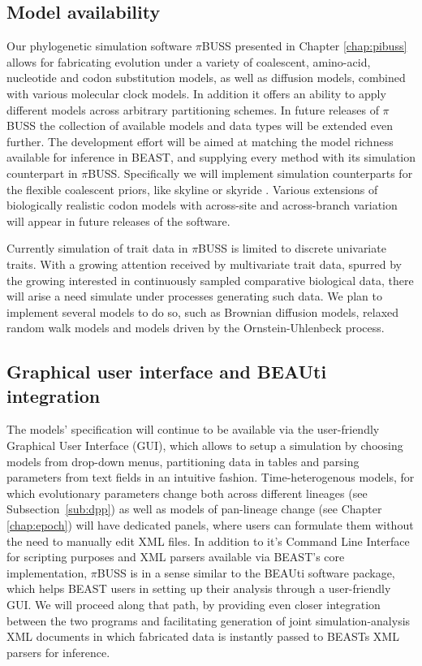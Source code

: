 \subsection{Model availability}

Our phylogenetic simulation software $\pi$BUSS presented in Chapter \ref{chap:pibuss} allows for fabricating evolution under a variety of coalescent, amino-acid, nucleotide and codon substitution models, as well as diffusion models, combined with various molecular clock models.
In addition it offers an ability to apply different models across arbitrary partitioning schemes. %
In future releases of $\pi$BUSS the collection of available models and data types will be extended even further.
The development effort will be aimed at matching the model richness available for inference in BEAST, and supplying every method with its simulation counterpart in $\pi$BUSS.
Specifically we will implement simulation counterparts for the flexible coalescent priors, like skyline \citep{Drummond2005} or skyride \citep{Minin2008b}.
Various extensions of biologically realistic codon models with across-site and across-branch variation will appear in future releases of the software.

Currently simulation of trait data in $\pi$BUSS is limited to discrete univariate traits.
With a growing attention received by multivariate trait data, spurred by the growing interested in continuously sampled comparative biological data, there will arise a need simulate under processes generating such data.
We plan to implement several models to do so, such as Brownian diffusion models, relaxed random walk models and models driven by the Ornstein-Uhlenbeck process.

\subsection{Graphical user interface and BEAUti integration}

The models' specification will continue to be available via the user-friendly Graphical User Interface (GUI), which allows to setup a simulation by choosing models from drop-down menus, partitioning data in tables and parsing parameters from text fields in an intuitive fashion.
Time-heterogenous models, for which evolutionary parameters change both across different lineages (see Subsection~\ref{sub:dpp}) as well as models of pan-lineage change (see Chapter \ref{chap:epoch}) will have dedicated panels, where users can formulate them without the need to manually edit XML files.
In addition to it's Command Line Interface for scripting purposes and XML parsers available via BEAST's core implementation, $\pi$BUSS is in a sense similar to the BEAUti software package, which helps BEAST users in setting up their analysis through a user-friendly GUI.
We will proceed along that path, by providing even closer integration between the two programs and facilitating generation of joint simulation-analysis XML documents in which fabricated data is instantly passed to BEASTs XML parsers for inference.

